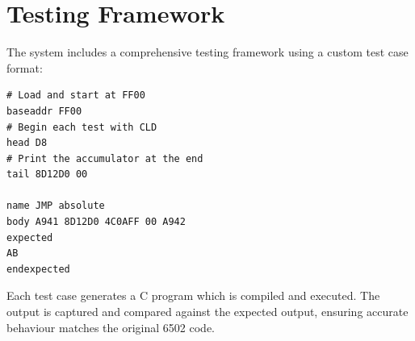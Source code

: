 \documentclass[10pt,twocolumn]{article}
\begin{document}





\section{Testing Framework}
The system includes a comprehensive testing framework using a custom test case format:
\begin{verbatim}
# Load and start at FF00
baseaddr FF00
# Begin each test with CLD
head D8
# Print the accumulator at the end
tail 8D12D0 00

name JMP absolute
body A941 8D12D0 4C0AFF 00 A942
expected
AB
endexpected
\end{verbatim}

Each test case generates a C program which is compiled and executed. The output is captured and compared against the expected output, ensuring accurate behaviour matches the original 6502 code.
\end{document}
